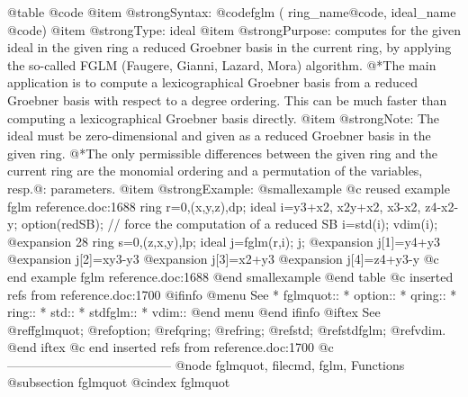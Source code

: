 @table @code
@item @strong{Syntax:}
@code{fglm (} ring_name@code{,} ideal_name @code{)}
@item @strong{Type:}
ideal
@item @strong{Purpose:}
computes for the given ideal in the given ring
a reduced Groebner basis in the current ring, by applying the so-called FGLM
(Faugere, Gianni, Lazard, Mora)  algorithm.
@*The main application is to compute a lexicographical Groebner basis
from a reduced Groebner basis with respect to a degree ordering. This
can be much faster than computing a lexicographical Groebner basis
directly.
@item @strong{Note:}
The ideal must be zero-dimensional and given as a reduced Groebner
basis in the given ring.
@*The only permissible differences between the given ring and the current ring
are the monomial ordering and a permutation of the variables,
resp.@: parameters.
@item @strong{Example:}
@smallexample
@c reused example fglm reference.doc:1688 
  ring r=0,(x,y,z),dp;
  ideal i=y3+x2, x2y+x2, x3-x2, z4-x2-y;
  option(redSB);   // force the computation of a reduced SB
  i=std(i);
  vdim(i);
@expansion{} 28
  ring s=0,(z,x,y),lp;
  ideal j=fglm(r,i);
  j;
@expansion{} j[1]=y4+y3
@expansion{} j[2]=xy3-y3
@expansion{} j[3]=x2+y3
@expansion{} j[4]=z4+y3-y
@c end example fglm reference.doc:1688
@end smallexample
@end table
@c inserted refs from reference.doc:1700
@ifinfo
@menu
See
* fglmquot::
* option::
* qring::
* ring::
* std::
* stdfglm::
* vdim::
@end menu
@end ifinfo
@iftex
See
@ref{fglmquot};
@ref{option};
@ref{qring};
@ref{ring};
@ref{std};
@ref{stdfglm};
@ref{vdim}.
@end iftex
@c end inserted refs from reference.doc:1700
@c ---------------------------------------
@node fglmquot, filecmd, fglm, Functions
@subsection fglmquot
@cindex fglmquot

